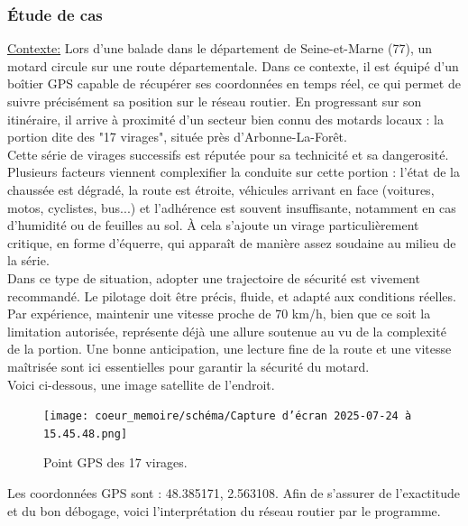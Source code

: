 \subsubsection{Étude de cas}
\underline{Contexte:} Lors d’une balade dans le département de Seine-et-Marne (77), un motard circule sur une route départementale. Dans ce contexte, il est équipé d’un boîtier GPS capable de récupérer ses coordonnées en temps réel, ce qui permet de suivre précisément sa position sur le réseau routier. En progressant sur son itinéraire, il arrive à proximité d’un secteur bien connu des motards locaux : la portion dite des "17 virages", située près d’Arbonne-La-Forêt.\\
Cette série de virages successifs est réputée pour sa technicité et sa dangerosité. Plusieurs facteurs viennent complexifier la conduite sur cette portion : l’état de la chaussée est dégradé, la route est étroite, véhicules arrivant en face (voitures, motos, cyclistes, bus...) et l’adhérence est souvent insuffisante, notamment en cas d’humidité ou de feuilles au sol. À cela s’ajoute un virage particulièrement critique, en forme d’équerre, qui apparaît de manière assez soudaine au milieu de la série. \\

Dans ce type de situation, adopter une trajectoire de sécurité est vivement recommandé. Le pilotage doit être précis, fluide, et adapté aux conditions réelles. Par expérience, maintenir une vitesse proche de 70 km/h, bien que ce soit la limitation autorisée, représente déjà une allure soutenue au vu de la complexité de la portion. Une bonne anticipation, une lecture fine de la route et une vitesse maîtrisée sont ici essentielles pour garantir la sécurité du motard.\\
Voici ci-dessous, une image satellite de l'endroit.

\begin{figure}[H]
    \centering
    \texttt{[image: coeur\_memoire/schéma/Capture d’écran 2025-07-24 à 15.45.48.png]} 
    \caption{Point GPS des 17 virages.}
\end{figure}

Les coordonnées GPS sont : 48.385171, 2.563108. Afin de s'assurer de l'exactitude et du bon débogage, voici l'interprétation du réseau routier par le programme.

